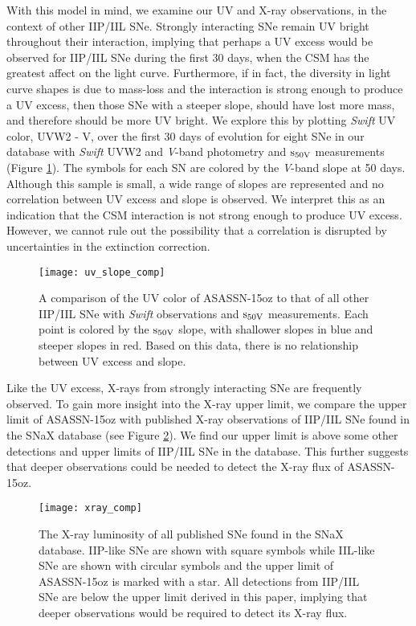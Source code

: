 \documentclass[a4paper,fleqn,usenatbib]{mnras}
\begin{document}
With this model in mind, we examine our UV and X-ray observations, in the context of other IIP/IIL SNe.
Strongly interacting SNe remain UV bright throughout their interaction, implying that perhaps a UV excess would be observed for IIP/IIL SNe during the first 30 days, when the CSM has the greatest affect on the light curve.
Furthermore, if in fact, the diversity in light curve shapes is due to mass-loss and the interaction is strong enough to produce a UV excess, then those SNe with a steeper slope, should have lost more mass, and therefore should be more UV bright.
We explore this by plotting {\it Swift} UV color, UVW2 - V, over the first 30 days of evolution for eight SNe in our database with {\it Swift} UVW2 and {\it V}-band photometry and $\rm{s_{50V}}$ measurements (Figure \ref{fig:UVColor}). 
The symbols for each SN are colored by the {\it V}-band slope at 50 days. 
Although this sample is small, a wide range of slopes are represented and no correlation between UV excess and slope is observed.
We interpret this as an indication that the CSM interaction is not strong enough to produce UV excess.
However, we cannot rule out the possibility that a correlation is disrupted by uncertainties in the extinction correction.
\begin{figure}
\begin{center}
\texttt{[image: uv\_slope\_comp]} %
\caption{A comparison of the UV color of ASASSN-15oz to that of all other IIP/IIL SNe with \textit{Swift} observations and $\rm{s_{50V}}$ measurements.
Each point is colored by the $\rm{s_{50V}}$ slope, with shallower slopes in blue and steeper slopes in red. 
Based on this data, there is no relationship between UV excess and slope.}
\label{fig:UVColor}
\end{center}
\end{figure}

Like the UV excess, X-rays from strongly interacting SNe are frequently observed.
To gain more insight into the X-ray upper limit, we compare the upper limit of ASASSN-15oz with published X-ray observations of IIP/IIL SNe found in the SNaX database \citep{2017ross} (see Figure \ref{fig:xray}).
We find our upper limit is above some other detections and upper limits of IIP/IIL SNe in the database.
This further suggests that deeper observations could be needed to detect the X-ray flux of ASASSN-15oz.
\begin{figure}
\begin{center}
\texttt{[image: xray\_comp]} %
\caption{The X-ray luminosity of all published SNe found in the SNaX database. 
IIP-like SNe are shown with square symbols while IIL-like SNe are shown with circular symbols and the upper limit of ASASSN-15oz is marked with a star.
All detections from IIP/IIL SNe are below the upper limit derived in this paper, implying that deeper observations would be required to detect its X-ray flux.}
\label{fig:xray}
\end{center}
\end{figure}
\end{document}
